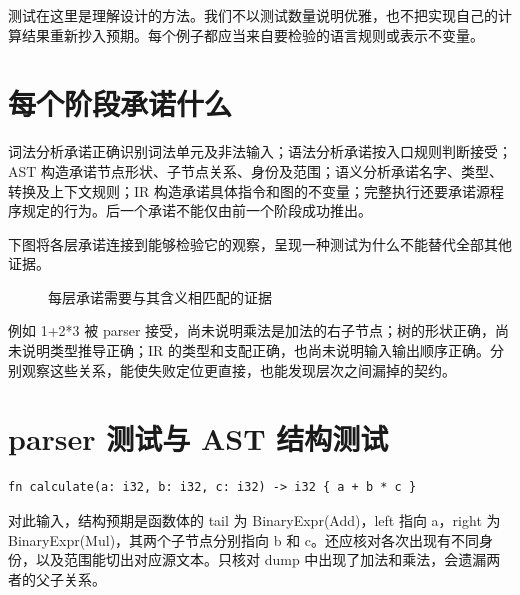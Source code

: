 测试在这里是理解设计的方法。我们不以测试数量说明优雅，也不把实现自己的计算结果重新抄入预期。每个例子都应当来自要检验的语言规则或表示不变量。

\section{每个阶段承诺什么}
词法分析承诺正确识别词法单元及非法输入；语法分析承诺按入口规则判断接受；AST 构造承诺节点形状、子节点关系、身份及范围；语义分析承诺名字、类型、转换及上下文规则；IR 构造承诺具体指令和图的不变量；完整执行还要承诺源程序规定的行为。后一个承诺不能仅由前一个阶段成功推出。

下图将各层承诺连接到能够检验它的观察，呈现一种测试为什么不能替代全部其他证据。
\begin{figure}[htbp]\centering
{}
\caption{每层承诺需要与其含义相匹配的证据}
\end{figure}

例如 1+2*3 被 parser 接受，尚未说明乘法是加法的右子节点；树的形状正确，尚未说明类型推导正确；IR 的类型和支配正确，也尚未说明输入输出顺序正确。分别观察这些关系，能使失败定位更直接，也能发现层次之间漏掉的契约。

\section{parser 测试与 AST 结构测试}
\begin{lstlisting}[language=Rustless,caption={同一次语法接受还需要核对正确的树结构}]
fn calculate(a: i32, b: i32, c: i32) -> i32 { a + b * c }
\end{lstlisting}
对此输入，结构预期是函数体的 tail 为 BinaryExpr(Add)，left 指向 a，right 为 BinaryExpr(Mul)，其两个子节点分别指向 b 和 c。还应核对各次出现有不同身份，以及范围能切出对应源文本。只核对 dump 中出现了加法和乘法，会遗漏两者的父子关系。


